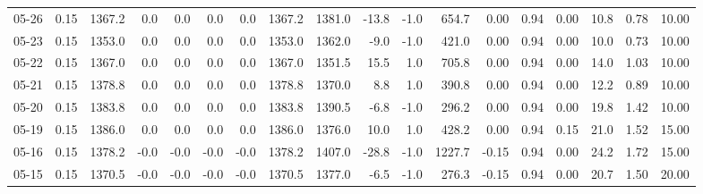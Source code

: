 \begin{threeparttable}
{\begin{tabular}{lrrrrrrrrrrrrrrrrr}
  05-26 &     0.15 & 1367.2 &               0.0 &               0.0 &                0.0 &                0.0 & 1367.2 & 1381.0 &      -13.8 &                     -1.0 &               654.7 &       0.00 &      0.94 &           0.00 &             10.8 &            0.78 &                  10.00 \\
  05-23 &     0.15 & 1353.0 &               0.0 &               0.0 &                0.0 &                0.0 & 1353.0 & 1362.0 &       -9.0 &                     -1.0 &               421.0 &       0.00 &      0.94 &           0.00 &             10.0 &            0.73 &                  10.00 \\
  05-22 &     0.15 & 1367.0 &               0.0 &               0.0 &                0.0 &                0.0 & 1367.0 & 1351.5 &       15.5 &                      1.0 &               705.8 &       0.00 &      0.94 &           0.00 &             14.0 &            1.03 &                  10.00 \\
  05-21 &     0.15 & 1378.8 &               0.0 &               0.0 &                0.0 &                0.0 & 1378.8 & 1370.0 &        8.8 &                      1.0 &               390.8 &       0.00 &      0.94 &           0.00 &             12.2 &            0.89 &                  10.00 \\
  05-20 &     0.15 & 1383.8 &               0.0 &               0.0 &                0.0 &                0.0 & 1383.8 & 1390.5 &       -6.8 &                     -1.0 &               296.2 &       0.00 &      0.94 &           0.00 &             19.8 &            1.42 &                  10.00 \\
  05-19 &     0.15 & 1386.0 &               0.0 &               0.0 &                0.0 &                0.0 & 1386.0 & 1376.0 &       10.0 &                      1.0 &               428.2 &       0.00 &      0.94 &           0.15 &             21.0 &            1.52 &                  15.00 \\
  05-16 &     0.15 & 1378.2 &              -0.0 &              -0.0 &               -0.0 &               -0.0 & 1378.2 & 1407.0 &      -28.8 &                     -1.0 &              1227.7 &      -0.15 &      0.94 &           0.00 &             24.2 &            1.72 &                  15.00 \\
  05-15 &     0.15 & 1370.5 &              -0.0 &              -0.0 &               -0.0 &               -0.0 & 1370.5 & 1377.0 &       -6.5 &                     -1.0 &               276.3 &      -0.15 &      0.94 &           0.00 &             20.7 &            1.50 &                  20.00 \\

\end{tabular}}
\end{threeparttable}

